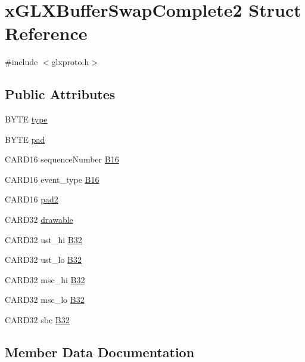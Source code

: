 \hypertarget{structx_g_l_x_buffer_swap_complete2}{}\section{x\+G\+L\+X\+Buffer\+Swap\+Complete2 Struct Reference}
\label{structx_g_l_x_buffer_swap_complete2}


{\ttfamily \#include $<$glxproto.\+h$>$}

\subsection*{Public Attributes}
\begin{DoxyCompactItemize}
\item 
B\+Y\+TE \hyperlink{structx_g_l_x_buffer_swap_complete2_a2930f1ca58378930162e40cc0a3a6ac3}{type}
\item 
B\+Y\+TE \hyperlink{structx_g_l_x_buffer_swap_complete2_ad76021ca0de7ae429171a41815b56e1d}{pad}
\item 
C\+A\+R\+D16 sequence\+Number \hyperlink{structx_g_l_x_buffer_swap_complete2_a8b6c557e906042fb5bff2c694b996b3e}{B16}
\item 
C\+A\+R\+D16 event\+\_\+type \hyperlink{structx_g_l_x_buffer_swap_complete2_a6eab80de0ab225c5d36107466679d2d7}{B16}
\item 
C\+A\+R\+D16 \hyperlink{structx_g_l_x_buffer_swap_complete2_a541377708bec07404470242b24d28bc2}{pad2}
\item 
C\+A\+R\+D32 \hyperlink{structx_g_l_x_buffer_swap_complete2_a2ee1cc40160281da40262aec99261573}{drawable}
\item 
C\+A\+R\+D32 ust\+\_\+hi \hyperlink{structx_g_l_x_buffer_swap_complete2_a6b3bf0aab4c07277fb7116d253a911a8}{B32}
\item 
C\+A\+R\+D32 ust\+\_\+lo \hyperlink{structx_g_l_x_buffer_swap_complete2_ac7caae1f6918a4455e1d8d6a75aa0a8f}{B32}
\item 
C\+A\+R\+D32 msc\+\_\+hi \hyperlink{structx_g_l_x_buffer_swap_complete2_a86a64ee7cce52a98a3b48d810e0a991c}{B32}
\item 
C\+A\+R\+D32 msc\+\_\+lo \hyperlink{structx_g_l_x_buffer_swap_complete2_a4e47a4781135026953b986cd0471852f}{B32}
\item 
C\+A\+R\+D32 sbc \hyperlink{structx_g_l_x_buffer_swap_complete2_a57c8b95b65b4a6180e6b73305edd6b8e}{B32}
\end{DoxyCompactItemize}


\subsection{Member Data Documentation}
\mbox{\label{structx_g_l_x_buffer_swap_complete2_a8b6c557e906042fb5bff2c694b996b3e}} 
